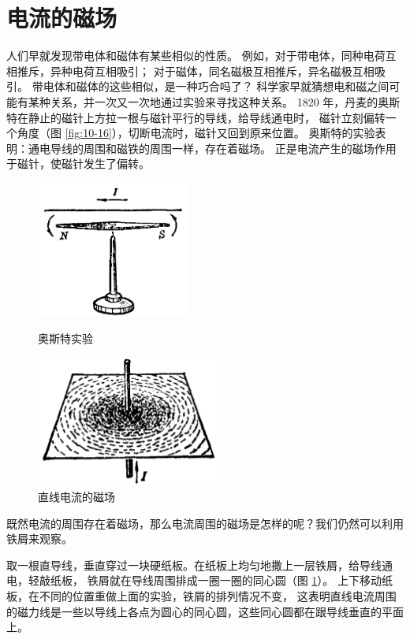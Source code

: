 \section{电流的磁场}\label{sec:10-4}

人们早就发现带电体和磁体有某些相似的性质。
例如，对于带电体，同种电荷互相推斥，异种电荷互相吸引；
对于磁体，同名磁极互相推斥，异名磁极互相吸引。
带电体和磁体的这些相似，是一种巧合吗了？
科学家早就猜想电和磁之间可能有某种关系，并一次又一次地通过实验来寻找这种关系。
1820 年，丹麦的奥斯特在静止的磁针上方拉一根与磁针平行的导线，给导线通电时，
磁针立刻偏转一个角度（图 \ref{fig:10-16}），切断电流时，磁针又回到原来位置。
奥斯特的实验表明：通电导线的周围和磁铁的周围一样，存在着磁场。
正是电流产生的磁场作用于磁针，使磁针发生了偏转。

\begin{figure}[htbp]
    \centering
    \begin{minipage}{7cm}
    \centering
    \includegraphics[width=5cm]{../pic/czwl2-ch10-16}
    \caption{奥斯特实验}\label{fig:10-16}
    \end{minipage}
    \qquad
    \begin{minipage}{7cm}
    \centering
    \includegraphics[width=6cm]{../pic/czwl2-ch10-17}
    \caption{直线电流的磁场}\label{fig:10-17}
    \end{minipage}
\end{figure}

既然电流的周围存在着磁场，那么电流周围的磁场是怎样的呢？我们仍然可以利用铁屑来观察。

取一根直导线，垂直穿过一块硬纸板。在纸板上均匀地撒上一层铁屑，给导线通电，轻敲纸板，
铁屑就在导线周围排成一圈一圈的同心圆（图 \ref{fig:10-17}）。
上下移动纸板，在不同的位置重做上面的实验，铁屑的排列情况不变，
这表明直线电流周围的磁力线是一些以导线上各点为圆心的同心圆，这些同心圆都在跟导线垂直的平面上。

